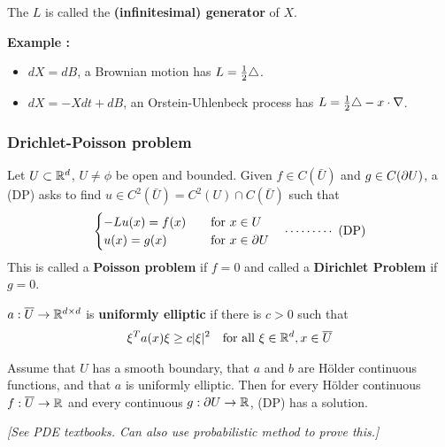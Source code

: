 \documentclass[10pt,a4paper]{article}
\renewenvironment{i}
{\begin{itemize} 
	}%
	{\end{itemize}
}
\begin{document}
 The $L$ is called the \textbf{(infinitesimal) generator} of $X$.
\s

\textbf{Example :}
\begin{i}
\item $dX =dB$, a Brownian motion has $L =\frac{1}{2}\triangle$.
\item $dX = -Xdt + dB$, an Orstein-Uhlenbeck process has $L = \frac{1}{2} \triangle - x\cdot \nabla$.
\end{i}
\s

\subsubsection*{Drichlet-Poisson problem}
Let $U\subset \mathbb{R}^d$, $U\neq \phi$ be open and bounded. Given $f\in C(\bar{U})$ and $g\in C(\partial U)$, a (DP) asks to find $u\in C^2(\bar{U})= C^2(U) \cap C(\bar{U})$ such that
\begin{align*}
\begin{cases}
-Lu(x) = f(x) \quad & \text{for }x\in U \\
u(x) = g(x) \quad & \text{for } x\in \partial U
\end{cases} \quad \cdots\cdots\cdots\,\,(\text{DP})
\end{align*}
This is called a \textbf{Poisson problem} if $f=0$ and called a \textbf{Dirichlet Problem} if $g=0$.
\s

 $a: \overline{U} \rightarrow \mathbb{R}^{d\times d}$ is \textbf{uniformly elliptic} if there is $c>0$ such that
\begin{align*}
\xi^T a(x) \xi \geq c|\xi|^2 \quad \text{for all } \xi \in \mathbb{R}^d, x\in \overline{U}
\end{align*}
\s

\thm Assume that $U$ has a smooth boundary, that $a$ and $b$ are H\"older continuous functions, and that $a$ is uniformly elliptic. Then for every H\"older continuous $f: \overline{U} \rightarrow \mathbb{R}$ and every continuous $g: \partial U \rightarrow \mathbb{R}$, (DP)  has a solution.

\emph{[See PDE textbooks. Can also use probabilistic method to prove this.]}
\s
\end{document}

